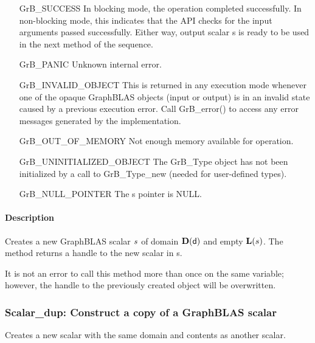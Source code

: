 \begin{itemize}[leftmargin=2.1in]
    \item[{\sf GrB\_SUCCESS}]         In blocking mode, the operation completed
    successfully. In non-blocking mode, this indicates that the API checks 
    for the input arguments passed successfully. Either way, output scalar 
    {\sf s} is ready to be used in the next method of the sequence.

    \item[{\sf GrB\_PANIC}]           Unknown internal error.
    
    \item[{\sf GrB\_INVALID\_OBJECT}] This is returned in any execution mode 
    whenever one of the opaque GraphBLAS objects (input or output) is in an invalid 
    state caused by a previous execution error.  Call {\sf GrB\_error()} to access 
    any error messages generated by the implementation.

    \item[{\sf GrB\_OUT\_OF\_MEMORY}] Not enough memory available for operation.
    
    \item[{\sf GrB\_UNINITIALIZED\_OBJECT}]  The {\sf GrB\_Type} object has not 
    been initialized by a call to {\sf GrB\_Type\_new} (needed for user-defined types).
    
    \item[{\sf GrB\_NULL\_POINTER}]  The {\sf s} pointer is {\sf NULL}.
\end{itemize}

\paragraph{Description}

Creates a new GraphBLAS scalar ${s}$ of domain $\mathbf{D}({\sf d})$ and empty 
$\mathbf{L}({s})$. The method returns a handle to the new scalar in {\sf s}.

It is not an error to call this method more than once on the same variable;  
however, the handle to the previously created object will be overwritten. 

\subsubsection{{\sf Scalar\_dup}: Construct a copy of a GraphBLAS scalar}

Creates a new scalar with the same domain and contents as another scalar.

